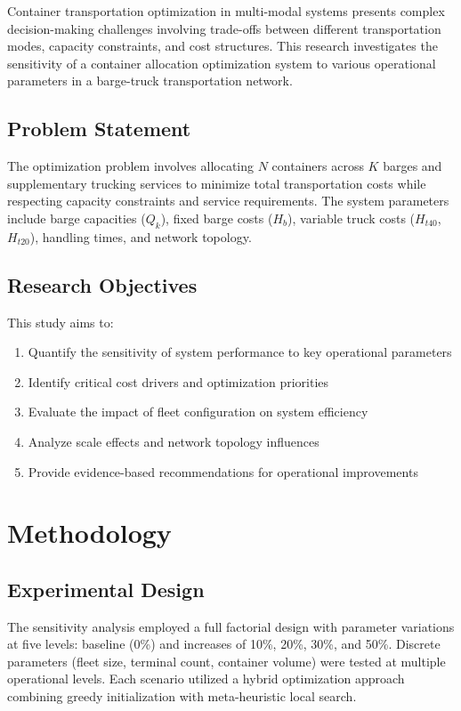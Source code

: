 \documentclass[12pt,a4paper]{article}
\begin{document}
Container transportation optimization in multi-modal systems presents complex decision-making challenges involving trade-offs between different transportation modes, capacity constraints, and cost structures. This research investigates the sensitivity of a container allocation optimization system to various operational parameters in a barge-truck transportation network.

\subsection{Problem Statement}

The optimization problem involves allocating $N$ containers across $K$ barges and supplementary trucking services to minimize total transportation costs while respecting capacity constraints and service requirements. The system parameters include barge capacities ($Q_k$), fixed barge costs ($H_b$), variable truck costs ($H_{t40}$, $H_{t20}$), handling times, and network topology.

\subsection{Research Objectives}

This study aims to:
\begin{enumerate}
    \item Quantify the sensitivity of system performance to key operational parameters
    \item Identify critical cost drivers and optimization priorities
    \item Evaluate the impact of fleet configuration on system efficiency
    \item Analyze scale effects and network topology influences
    \item Provide evidence-based recommendations for operational improvements
\end{enumerate}

\section{Methodology}

\subsection{Experimental Design}

The sensitivity analysis employed a full factorial design with parameter variations at five levels: baseline (0\%) and increases of 10\%, 20\%, 30\%, and 50\%. Discrete parameters (fleet size, terminal count, container volume) were tested at multiple operational levels. Each scenario utilized a hybrid optimization approach combining greedy initialization with meta-heuristic local search.
\end{document}
